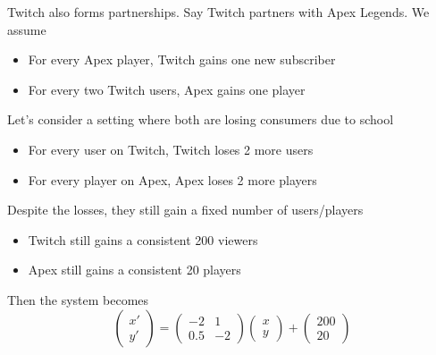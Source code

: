 \documentclass[12pt]{article}
\begin{document}
Twitch also forms partnerships. Say Twitch partners with Apex Legends. We assume
\begin{itemize}
	\item For every Apex player, Twitch gains one new subscriber
	\item For every two Twitch users, Apex gains one player
\end{itemize}

Let's consider a setting where both are losing consumers due to school
\begin{itemize}
	\item For every user on Twitch, Twitch loses 2 more users
	\item For every player on Apex, Apex loses 2 more players
\end{itemize}

Despite the losses, they still gain a fixed number of users/players
\begin{itemize}
	\item Twitch still gains a consistent 200 viewers
	\item Apex still gains a consistent 20 players
\end{itemize}
Then the system becomes
$$\begin{pmatrix} x' \\ y' \end{pmatrix} = \begin{pmatrix} -2 & 1 \\ 0.5 & -2 \end{pmatrix} \begin{pmatrix} x \\ y \end{pmatrix} + \begin{pmatrix} 200 \\ 20 \end{pmatrix}$$
\end{document}
